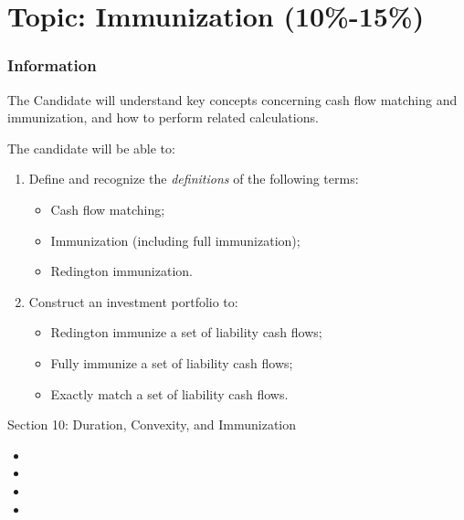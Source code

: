 \chapter[Topic: Immunization]{Topic: Immunization (10\%-15\%)}

\subsection{Information}

\begin{distributions}[Objective]
The Candidate will understand key concepts concerning cash flow matching and immunization, and how to perform related calculations.
\end{distributions}

\begin{outcomes}
The candidate will be able to:
\begin{enumerate}[label = \alph*)]
	\item	Define and recognize the \textit{definitions} of the following terms:
		\begin{itemize}[leftmargin = *]
		\item	Cash flow matching;
		\item	Immunization (including full immunization);
		\item	Redington immunization.
		\end{itemize}
	\item	Construct an investment portfolio to:
		\begin{itemize}[leftmargin = *]
		\item	Redington immunize a set of liability cash flows;
		\item	Fully immunize a set of liability cash flows;
		\item	Exactly match a set of liability cash flows.
		\end{itemize}
\end{enumerate}
\end{outcomes}

\begin{ASM_chapter}
Section 10: Duration, Convexity, and Immunization
\begin{itemize}[leftmargin = *]
	\item	{}
	\item	{}
	\item	{}
	\item	{}
\end{itemize}
\end{ASM_chapter}

